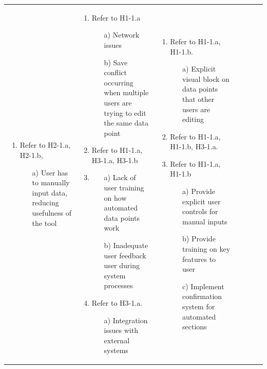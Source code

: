 \documentclass{article}
\begin{document}
\begin{landscape}
\begin{longtable}{|p{3cm}|p{3cm}|p{4cm}|p{4cm}|p{3cm}|p{2cm}|p{3cm}|}
\begin{enumerate}[leftmargin=*]
      \item Refer to H2-1.a, H2-1.b,
      \begin{enumerate}
        \item[a)] User has to manually input data, reducing usefulness of the tool
    \end{enumerate}
  \end{enumerate} &
  \begin{enumerate}[leftmargin=*]
       \item Refer to H1-1.a
       \begin{enumerate}
            \item[a)] Network issues
            \item[b)] Save conflict occurring when multiple users are trying to edit the same data point
        \end{enumerate}
       \item Refer to H1-1.a, H3-1.a, H3-1.b
       \item 
       \begin{enumerate}
            \item[a)] Lack of user training on how automated data points work
            \item[b)] Inadequate user feedback user during system processes
        \end{enumerate}
       \item Refer to H3-1.a.
       \begin{enumerate}
            \item[a)] Integration issues with external systems
        \end{enumerate}
  \end{enumerate} &
  \begin{enumerate}[leftmargin=*]
    \item Refer to H1-1.a, H1-1.b.
    \begin{enumerate}
        \item[a)] Explicit visual block on data points that other users are editing
    \end{enumerate}
    \item Refer to H1-1.a, H1-1.b, H3-1.a.
    \item Refer to H1-1.a, H1-1.b
    \begin{enumerate}
        \item[a)] Provide explicit user controls for manual inputs
        \item[b)] Provide training on key features to user
        \item[c)] Implement confirmation system for automated sections

\end{enumerate}
\end{enumerate}
\end{longtable}
\end{landscape}
\end{document}
